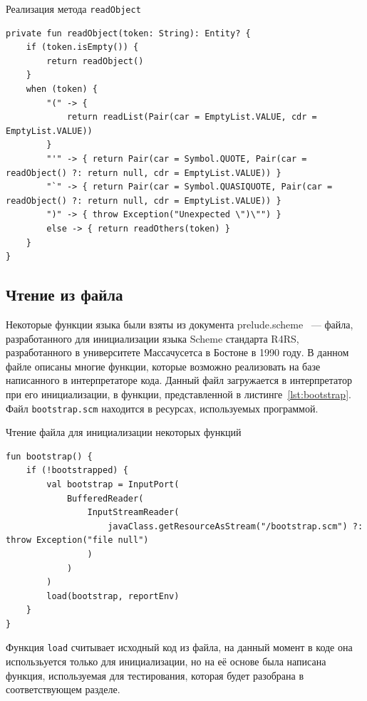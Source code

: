 \documentclass[14pt, russian]{scrartcl}
\begin{document}
\begin{listing}[!htb]
\caption{Реализация метода \texttt{readObject}}
\label{lst:readobject}
\begin{verbatim}
private fun readObject(token: String): Entity? {
    if (token.isEmpty()) {
        return readObject()
    }
    when (token) {
        "(" -> {
            return readList(Pair(car = EmptyList.VALUE, cdr = EmptyList.VALUE))
        }
        "'" -> { return Pair(car = Symbol.QUOTE, Pair(car = readObject() ?: return null, cdr = EmptyList.VALUE)) }
        "`" -> { return Pair(car = Symbol.QUASIQUOTE, Pair(car = readObject() ?: return null, cdr = EmptyList.VALUE)) }
        ")" -> { throw Exception("Unexpected \")\"") }
        else -> { return readOthers(token) }
    }
}
\end{verbatim}
\end{listing}

\subsection{Чтение из файла}

Некоторые функции языка были взяты из документа prelude.scheme~\cite{UMBScheme} --- файла, разработанного для инициализации языка Scheme стандарта R4RS, разработанного в университете Массачусетса в Бостоне в 1990 году.
В данном файле описаны многие функции, которые возможно реализовать на базе написанного в интерпретаторе кода. Данный файл загружается в интерпретатор при его инициализации, в функции, представленной в листинге~\ref{lst:bootstrap}.
Файл \texttt{bootstrap.scm} находится в ресурсах, используемых программой.

\begin{listing}[!htb]
\caption{Чтение файла для инициализации некоторых функций}
\label{lst:bootstrap}
\begin{verbatim}
fun bootstrap() {
    if (!bootstrapped) {
        val bootstrap = InputPort(
            BufferedReader(
                InputStreamReader(
                    javaClass.getResourceAsStream("/bootstrap.scm") ?: throw Exception("file null")
                )
            )
        )
        load(bootstrap, reportEnv)
    }
}
\end{verbatim}
\end{listing}

Функция \texttt{load} считывает исходный код из файла, на данный момент в коде она использьуется только для инициализации, но на её основе была написана функция, используемая для тестирования, которая будет разобрана в соответствующем разделе.
\end{document}
